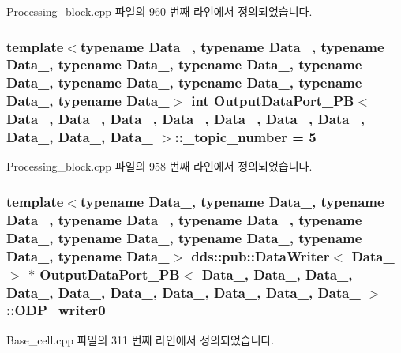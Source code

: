 Processing\+\_\+block.\+cpp 파일의 960 번째 라인에서 정의되었습니다.

\subsubsection[{\texorpdfstring{\+\_\+topic\+\_\+number}{_topic_number}}]{\setlength{\rightskip}{0pt plus 5cm}template$<$typename Data\+\_, typename Data\+\_, typename Data\+\_, typename Data\+\_, typename Data\+\_, typename Data\+\_, typename Data\+\_, typename Data\+\_, typename Data\+\_, typename Data\+\_$>$ int {\bf Output\+Data\+Port\+\_\+\+PB}$<$ Data\+\_, Data\+\_, Data\+\_, Data\+\_, Data\+\_, Data\+\_, Data\+\_, Data\+\_, Data\+\_, Data\+\_ $>$\+::\+\_\+topic\+\_\+number = 5\hspace{0.3cm}{\ttfamily [private]}}\hypertarget{classOutputDataPort__PB_a54ea60b6f431113133f57a4e98b2d660}{}\label{classOutputDataPort__PB_a54ea60b6f431113133f57a4e98b2d660}


Processing\+\_\+block.\+cpp 파일의 958 번째 라인에서 정의되었습니다.

\subsubsection[{\texorpdfstring{O\+D\+P\+\_\+writer0}{ODP_writer0}}]{\setlength{\rightskip}{0pt plus 5cm}template$<$typename Data\+\_, typename Data\+\_, typename Data\+\_, typename Data\+\_, typename Data\+\_, typename Data\+\_, typename Data\+\_, typename Data\+\_, typename Data\+\_, typename Data\+\_$>$ dds\+::pub\+::\+Data\+Writer$<$ Data\+\_ $>$ $\ast$ {\bf Output\+Data\+Port\+\_\+\+PB}$<$ Data\+\_, Data\+\_, Data\+\_, Data\+\_, Data\+\_, Data\+\_, Data\+\_, Data\+\_, Data\+\_, Data\+\_ $>$\+::O\+D\+P\+\_\+writer0}\hypertarget{classOutputDataPort__PB_aef51cf50cf81a472d598409204935554}{}\label{classOutputDataPort__PB_aef51cf50cf81a472d598409204935554}


Base\+\_\+cell.\+cpp 파일의 311 번째 라인에서 정의되었습니다.

